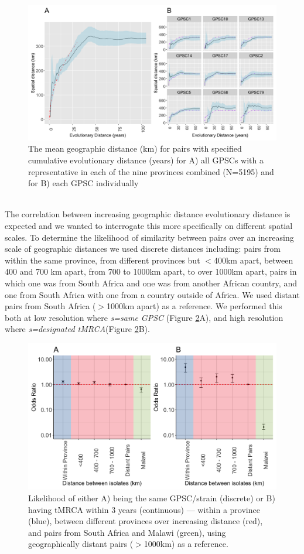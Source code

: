\documentclass{article}
\begin{document}
\begin{figure}[H]
\centering
    \includegraphics[width=\textwidth]{transrate_AB.png}
    \caption{The mean geographic distance (km) for pairs with specified cumulative evolutionary distance (years) for A) all GPSCs with a representative in each of the nine provinces combined (N=5195) and for B) each GPSC individually}
      \label{fig:transrate}
\end{figure}
\\The correlation between increasing geographic distance evolutionary distance is expected and we wanted to interrogate this more specifically on different spatial scales. To determine the likelihood of similarity between pairs over an increasing scale of geographic distances we used discrete distances including: pairs from within the same province, from different provinces but $<$400km apart, between 400 and 700 km apart, from 700 to 1000km apart, to over 1000km apart, pairs in which one was from South Africa and one was from another African country, and one from South Africa with one from a country outside of Africa. We used distant pairs from South Africa ($>$1000km apart) as a reference. We performed this both at low resolution where \textit{s=same GPSC} (Figure \ref{fig:strainvstmrca}A), and high resolution where \textit{s=designated tMRCA}(Figure \ref{fig:strainvstmrca}B).  
\begin{figure}[H]
\centering
    \includegraphics[width=\textwidth]{strainvstmrca.png}
    \caption{Likelihood of either A) being the same GPSC/strain (discrete) or B) having tMRCA within 3 years (continuous) --- within a province (blue), between different provinces over increasing distance (red), and pairs from South Africa and Malawi (green), using geographically distant pairs ($>$1000km) as a reference.}
      \label{fig:strainvstmrca}
\end{figure}
\end{document}
